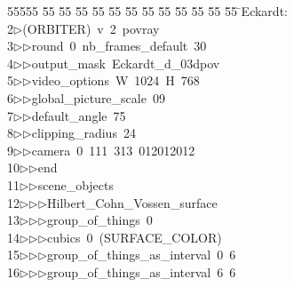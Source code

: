%
%
\begin{tabbing}
55555 \= 55 \= 55 \= 55 \= 55 \= 55 \= 55 \= 55 \= 55 \= 55 \= 55 \= 55 \= 55 \= \>Eckardt:\\[0pt]
2\>$\triangleright$\>(ORBITER)\ v\ 2\ povray\ \\[0pt]
3\>$\triangleright$\>$\triangleright$\>round\ 0\ nb\_frames\_default\ 30\ \\[0pt]
4\>$\triangleright$\>$\triangleright$\>output\_mask\ Eckardt\_d\_03dpov\ \\[0pt]
5\>$\triangleright$\>$\triangleright$\>video\_options\ W\ 1024\ H\ 768\ \\[0pt]
6\>$\triangleright$\>$\triangleright$\>global\_picture\_scale\ 09\ \\[0pt]
7\>$\triangleright$\>$\triangleright$\>default\_angle\ 75\ \\[0pt]
8\>$\triangleright$\>$\triangleright$\>clipping\_radius\ 24\ \\[0pt]
9\>$\triangleright$\>$\triangleright$\>camera\ 0\ 111\ 313\ 012012012\ \\[0pt]
10\>$\triangleright$\>$\triangleright$\>end\ \\[0pt]
11\>$\triangleright$\>$\triangleright$\>scene\_objects\ \\[0pt]
12\>$\triangleright$\>$\triangleright$\>$\triangleright$\>Hilbert\_Cohn\_Vossen\_surface\ \\[0pt]
13\>$\triangleright$\>$\triangleright$\>$\triangleright$\>group\_of\_things\ 0\ \\[0pt]
14\>$\triangleright$\>$\triangleright$\>$\triangleright$\>cubics\ 0\ (SURFACE\_COLOR)\ \\[0pt]
15\>$\triangleright$\>$\triangleright$\>$\triangleright$\>group\_of\_things\_as\_interval\ 0\ 6\ \\[0pt]
16\>$\triangleright$\>$\triangleright$\>$\triangleright$\>group\_of\_things\_as\_interval\ 6\ 6\ \\[0pt]

\end{tabbing}
